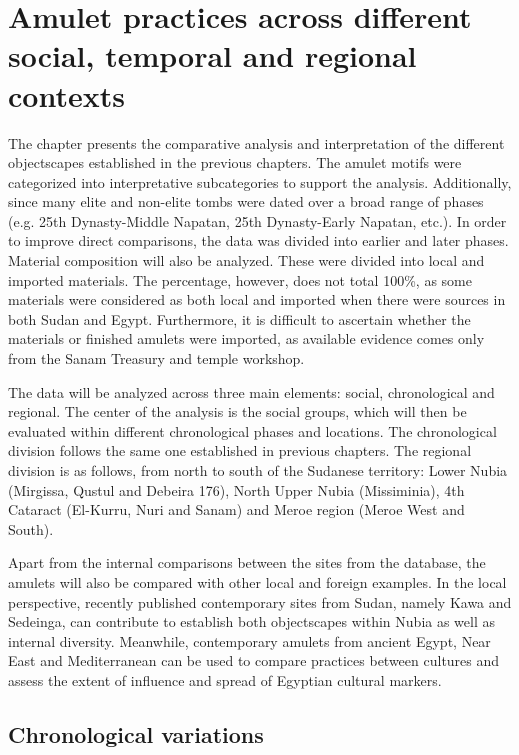 \chapter{Amulet practices across different social, temporal and regional contexts}

The chapter presents the comparative analysis and interpretation of the different objectscapes established in the previous chapters. The amulet motifs were categorized into interpretative subcategories to support the analysis. Additionally, since many elite and non-elite tombs were dated over a broad range of phases (e.g. 25th Dynasty-Middle Napatan, 25th Dynasty-Early Napatan, etc.). In order to improve direct comparisons, the data was divided into earlier and later phases. Material composition will also be analyzed. These were divided into local and imported materials. The percentage, however, does not total 100\%, as some materials were considered as both local and imported when there were sources in both Sudan and Egypt. Furthermore, it is difficult to ascertain whether the materials or finished amulets were imported, as available evidence comes only from the Sanam Treasury and temple workshop.

The data will be analyzed across three main elements: social, chronological and regional. The center of the analysis is the social groups, which will then be evaluated within different chronological phases and locations. The chronological division follows the same one established in previous chapters. The regional division is as follows, from north to south of the Sudanese territory: Lower Nubia (Mirgissa, Qustul and Debeira 176), North Upper Nubia (Missiminia), 4th Cataract (El-Kurru, Nuri and Sanam) and Meroe region (Meroe West and South).

Apart from the internal comparisons between the sites from the database, the amulets will also be compared with other local and foreign examples. In the local perspective, recently published contemporary sites from Sudan, namely Kawa and Sedeinga, can contribute to establish both objectscapes within Nubia as well as internal diversity. Meanwhile, contemporary amulets from ancient Egypt, Near East and Mediterranean can be used to compare practices between cultures and assess the extent of influence and spread of Egyptian cultural markers.

\section{Chronological variations}

